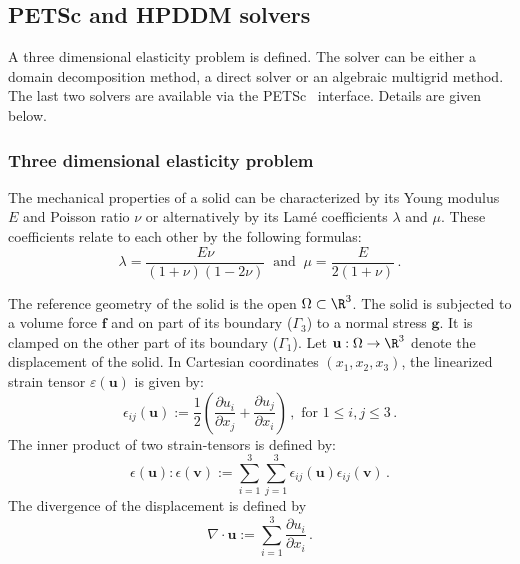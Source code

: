 
\subsection{PETSc and HPDDM solvers}


\begin{example}
	A three dimensional elasticity problem is defined. The solver can be either a  domain decomposition method, a direct solver or an algebraic multigrid method. The last two solvers are available via the PETSc~\cite{petsc-efficient,petsc-web-page} interface. Details are given below. 
\end{example}

\def\parallelScript{elasticity-3d.edp}


\subsubsection{Three dimensional elasticity problem} %
\label{sub:three_dimensional_elasticity_problem}


The mechanical properties of a solid can be characterized by its Young modulus $E$ and Poisson ratio $\nu$ or alternatively by its Lam\'e coefficients $\lambda$ and $\mu$. These coefficients relate to each other by the following formulas:
\begin{equation}
	\label{eq:parallel:lambdanu}
\lambda = \frac{E \nu}{(1+\nu) (1- 2 \nu)}\ \text{ and } \ \mu = \frac{E}{2(1+\nu)}\,.
\end{equation}

The reference geometry of the solid is the open $\Omega\subset \R^3$. The solid is subjected to a volume force $\mathbf{f}$ and on part of its boundary ($\Gamma_3$) to a normal stress $\mathbf{g}$. It is clamped on the other part of its boundary  ($\Gamma_1$). Let $\mathbf{u}:\Omega\rightarrow \R^3$ denote the displacement of the solid. In Cartesian coordinates $(x_1,x_2,x_3)$, the linearized strain tensor $\varepsilon({\mathbf{u}})$ is given by:
\[
\epsilon_{ij} (\mathbf{u}) :=  \frac{1}{2} \left( \frac{\partial u_i}{\partial x_j} + \frac{\partial u_j}{\partial x_i}\right) \,, \text{ for }1\le i,j\le 3\,. 
\]
The inner product of two strain-tensors is defined by:
\[
\epsilon (\mathbf{u}) : \epsilon(\mathbf{v}) := \sum_{i=1}^3 \sum_{j=1}^3 \epsilon_{ij} (\mathbf{u})  \epsilon_{ij} (\mathbf{v})\,.
\]
The divergence of the displacement is defined by
\[
\nabla \cdot \mathbf{u} := \sum_{i=1}^3 \frac{\partial u_i}{\partial x_i}\,.
\]

